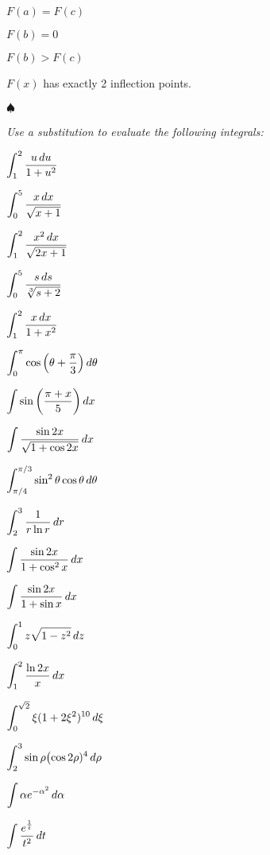 \begin{multicols}{2}
\subprob $F(a)=F(c)$ 

\subprob $F(b)=0$ 

\subprob $F(b)>F(c)$ 

\subprob $F(x)$ has exactly 2 inflection points.

$ \spadesuit $

\begingroup\itshape
Use a substitution to evaluate the following integrals:
\endgroup



\problem  \(\displaystyle \int_1^2\frac{u\, d u}{1+u^2}\) %

\problem \(\displaystyle \int_0^5 \frac{x\, dx}{\sqrt{x+1}}\) %

\problem \(\displaystyle \int_1^2 \frac{x^2\, dx}{\sqrt{2x+1}}\) %

\problem \(\displaystyle \int_0^5 \frac{s\, ds}{\sqrt[3]{s+2}}\) %

\problem \(\displaystyle \int_1^2\frac{x\, d x}{1+x^2}\) %

\problem \(\displaystyle \int_0^\pi \cos\left(\theta+\dfrac{\pi}{3}\right)d\theta\) %

\problem \(\displaystyle \int \sin\left(\frac{\pi+x}{5}\right) dx\) %

\problem \(\displaystyle \int \frac{\sin 2x}{\sqrt{1+\cos 2x}} \,dx\) %

\problem \(\displaystyle \int_{\pi/4}^{\pi/3} \sin^2\theta\cos\theta\, d \theta \) %

\problem \(\displaystyle \int_{2}^{3} \frac{1}{r\ln r}\, dr\) %

\problem \(\displaystyle \int \frac{\sin 2x}{1+\cos^2x}\,dx\) %

\problem \(\displaystyle \int \frac{\sin 2x}{1+\sin x}\,dx \) %

\problem \(\displaystyle \int_{0}^{1} z\sqrt{1-z^2}\, d z\) %

\problem \(\displaystyle \int_1^2 \frac{\ln 2x}x \, d x\) %

\problem \(\displaystyle \int_{0}^{\sqrt{2}} \xi (1+2\xi^2)^{10} \, d \xi \) %

\problem \(\displaystyle \int_{2}^{3} \sin \rho \bigl(\cos 2\rho)^4 \, d\rho\) %

\problem \(\displaystyle \int \alpha e^{-\alpha^2}\, d\alpha\) %

\problem \(\displaystyle \int \frac{\displaystyle e^{\frac1t}}{t^2}\, d t \) %

\end{multicols}
\noproblemfont


